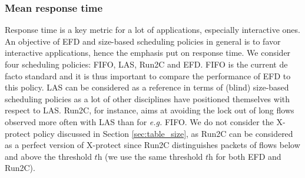 \documentclass[preprint,12pt]{elsarticle}
\begin{document}
\begin{table}[ht]
		\centering
    \caption{Statistics - flow table size}
		\vspace{5mm}
    \label{tab:flow_table_size}  
\end{table}

\subsubsection{Mean response time}

Response time is a key metric for a lot of applications, especially interactive ones. An objective of EFD and size-based scheduling policies in general  is to favor interactive applications, hence the emphasis put on response time. We consider four scheduling policies: FIFO, LAS, Run2C and EFD. FIFO is the current de facto standard and it is thus important to compare the performance of EFD to this policy. LAS can be considered as a reference in terms of (blind) size-based scheduling policies as a lot of other disciplines have positioned themselves with respect to LAS. Run2C, for instance, aims at avoiding the lock out of long flows observed more often with LAS than for \textit{e.g.} FIFO. We do not consider the X-protect policy discussed in Section \ref{sec:table_size}, as Run2C can be considered as a perfect version of X-protect since Run2C distinguishes packets of flows below and above the threshold $\textit{th}$ (we use the same threshold $\textit{th}$ for both EFD and Run2C).

\end{document}
